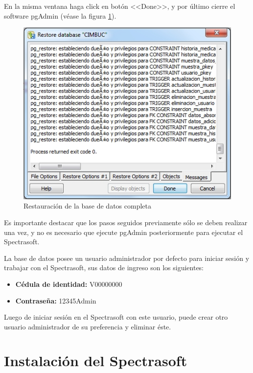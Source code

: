 En la misma ventana haga click en bot\'{o}n <<Done>>, y por \'{u}ltimo cierre el software pgAdmin (v\'{e}ase la figura \ref{fig:pgadmin-restaurar-listo}).
\vfill
\begin{figure}[H]
  \centering
  \includegraphics[width=.6\linewidth]{./img/pgadmin-restaurar-listo.jpg}
\caption[]{Restauraci\'{o}n de la base de datos completa\label{fig:pgadmin-restaurar-listo}}
\end{figure}
\vfill
Es importante destacar que los pasos seguidos previamente s\'{o}lo se deben realizar una vez, y no es necesario que ejecute pgAdmin posteriormente para ejecutar el Spectrasoft.

La base de datos posee un usuario administrador por defecto para iniciar sesi\'{o}n y trabajar con el Spectrasoft, sus datos de ingreso son los siguientes: 
\vfill
\begin{itemize}
	\item \textbf{C\'{e}dula de identidad:} V00000000
	
	\item \textbf{Contrase\~{n}a:} 12345Admin
\end{itemize}
\vfill
Luego de iniciar sesi\'{o}n en el Spectrasoft con este usuario, puede crear otro usuario administrador de su preferencia y eliminar \'{e}ste.

\section*{Instalaci\'{o}n del Spectrasoft}

